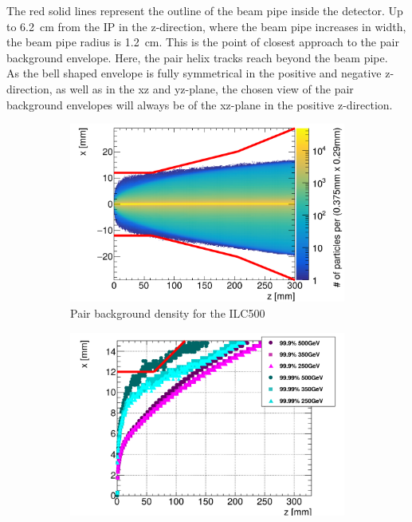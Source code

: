 The red solid lines represent the outline of the beam pipe inside the \sid detector.
Up to \SI{6.2}{\centi\meter} from the IP in the z-direction, where the beam pipe increases in width, the beam pipe radius is \SI{1.2}{\centi\meter}.
This is the point of closest approach to the pair background envelope.
Here, the pair helix tracks reach beyond the beam pipe.
\\As the bell shaped envelope is fully symmetrical in the positive and negative z-direction, as well as in the xz and yz-plane, the chosen view of the pair background envelopes will always be of the xz-plane in the positive z-direction.
 \begin{figure}
 \centering
  \begin{subfigure}[b]{0.49\textwidth}
   \centering
    \includegraphics[width=\textwidth]{Figures/Pairs/Helix_tracks_xz_80bunches_500GeV_5T.png}
   \caption{Pair background density for the ILC500}
   \end{subfigure}
   \hfill
    \begin{subfigure}[b]{0.49\textwidth}
   \centering
    \includegraphics[width=\textwidth]{Figures/Pairs/HelixEnvelopes_COMPARISON_xz_500_350_250_comparison_EDITED_2.png}

\end{subfigure}
\end{figure}
